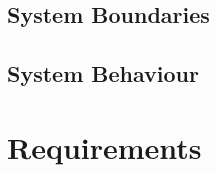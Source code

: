 \subsection{System Boundaries}
\label{sec:system-boundaries}

\subsection{System Behaviour}
\label{sec:system-behaviour}

\section{Requirements}
\label{sec:requirements}
